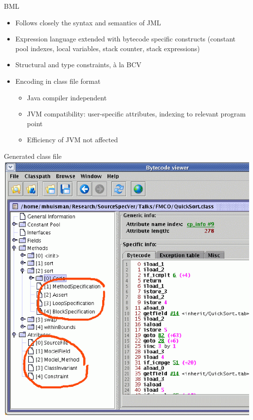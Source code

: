 \documentclass[final,nocolorBG,a4,mobius,nototal,pdf,slideColor]{prosper}
\begin{document}
\begin{slide}{BML}
 \begin{itemize}
 \item Follows closely the syntax and semantics of JML
 \item Expression language extended with bytecode specific constructs
(constant pool indexes, local variables, stack counter, stack 
expressions)
 \item Structural and type constraints, \`a la BCV
 \item Encoding in class file format
  \begin{itemize}
   \item Java compiler independent 
   \item JVM compatibility: user-specific attributes, indexing to
relevant program point
   \item Efficiency of JVM not affected
  \end{itemize}
 \end{itemize}
\end{slide} 


\begin{slide}{Generated class file}
\vspace*{-1.5em}
\includegraphics[height=\textheight]{screen10.ps}
\end{slide}
\end{document}
